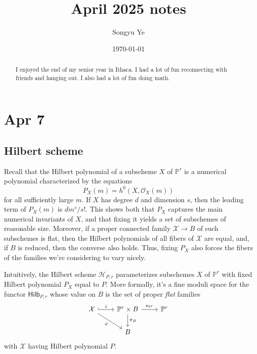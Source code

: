 \documentclass[12pt]{article}
\begin{document}
\rhead{\today}
\cfoot{\thepage}

\title{April 2025 notes}

\author{Songyu Ye}
\date{\today}
\maketitle


\begin{abstract}
    I enjoyed the end of my senior year in Ithaca. I had a lot of fun reconnecting with friends and hanging out. I also had a lot of fun doing math.
\end{abstract}

\tableofcontents

\section{Apr 7}
\subsection{Hilbert scheme}
Recall that the Hilbert polynomial of a subscheme $X$ of $\mathbb{P}^r$ is a numerical polynomial characterized by the equations
\[
    P_X(m) = h^0(X, \mathcal{O}_X(m))
\]
for all sufficiently large $m$. If $X$ has degree $d$ and dimension $s$, then the leading term of $P_X(m)$ is $dm^s/s!$. This shows both that $P_X$ captures the main numerical invariants of $X$, and that fixing it yields a set of subschemes of reasonable size. Moreover, if a proper connected family $\mathcal{X} \to B$ of such subschemes is flat, then the Hilbert polynomials of all fibers of $\mathcal{X}$ are equal, and, if $B$ is reduced, then the converse also holds. Thus, fixing $P_X$ also forces the fibers of the families we're considering to vary nicely.

Intuitively, the Hilbert scheme $\mathcal{H}_{P,r}$ parameterizes subschemes $X$ of $\mathbb{P}^r$ with fixed Hilbert polynomial $P_X$ equal to $P$. More formally, it's a fine moduli space for the functor $\mathsf{Hilb}_{P,r}$ whose value on $B$ is the set of proper \emph{flat} families
\[
    \begin{tikzcd}
        \mathcal{X} \arrow[hookrightarrow, "i"]{r} \arrow[dr, "\varphi"'] & \mathbb{P}^r \times B \arrow[d, "\pi_B"] \arrow[r, "\pi_{\mathbb{P}^r}"] & \mathbb{P}^r \\
        & B
    \end{tikzcd}
\]
with $\mathcal{X}$ having Hilbert polynomial $P$.
\end{document}
